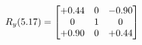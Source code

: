 \documentclass[preview]{standalone}
\begin{document}
\begin{align*}
\special{dvisvgm:raw <g id='unique000'>}R_{y}(5.17) = \begin{bmatrix}+0.44 & 0 & -0.90 \\0 & 1 & 0 \\+0.90 & 0 & +0.44\end{bmatrix}\special{dvisvgm:raw </g>}
\end{align*}
\end{document}
